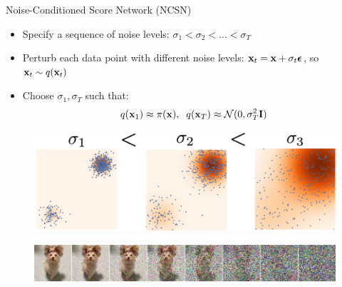 \documentclass{beamer}
\begin{document}
\begin{frame}{Noise-Conditioned Score Network (NCSN)}
	\begin{itemize}
		\item Specify a sequence of noise levels: $\sigma_1 < \sigma_2 < \dots < \sigma_T$
		\item Perturb each data point with different noise levels: $\mathbf{x}_t = \mathbf{x} + \sigma_t \boldsymbol{\epsilon}$, so $\mathbf{x}_t \sim q(\mathbf{x}_t)$
		\item Choose $\sigma_1, \sigma_T$ such that:
		\[
			q(\mathbf{x}_1) \approx \pi(\mathbf{x}), \;\; q(\mathbf{x}_T) \approx \mathcal{N}(0, \sigma_T^2 \mathbf{I})
		\]
	\end{itemize}
    \eqpause
	\vspace{-0.3cm}
	\begin{figure}
		\includegraphics[width=0.6\linewidth]{figs/multi_scale}
	\end{figure}
	\begin{figure}
		\includegraphics[width=\linewidth]{figs/duoduo}
	\end{figure}
\end{frame}
\end{document}
